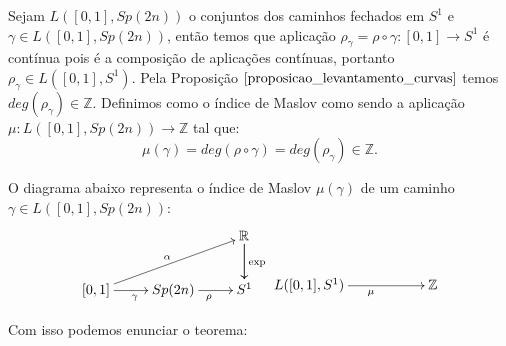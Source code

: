 \documentclass[12pt]{book}
\newcommand{\caminhosfechadoscirculo}[2]{L([#1,#2], S^{1})}
\newcommand{\caminhosfechadosSp}[2]{L([#1,#2], \gruposimpletico{2n})}
\newcommand{\gruposimpletico}[1]{Sp(#1)}
\newcommand{\real}[1]{\mathbb{R}^{#1}}
\begin{document}
	Sejam $\caminhosfechadosSp{0}{1}$ o conjuntos dos caminhos fechados em $S^{1}$ e $\gamma \in \caminhosfechadosSp{0}{1}$, então temos que aplicação $\rho_{\gamma}=\rho\circ \gamma:[0,1] \to S^{1}$ é contínua pois é a composição de aplicações contínuas, portanto $\rho_{\gamma} \in \caminhosfechadoscirculo{0}{1}$. Pela Proposição $\ref{proposicao_levantamento_curvas}$ temos $deg(\rho_{\gamma}) \in \mathbb{Z}$. Definimos como o índice de Maslov como sendo a aplicação $\mu:\caminhosfechadosSp{0}{1} \to \mathbb{Z}$ tal que:
	$$
	\mu(\gamma) = deg(\rho \circ \gamma) = deg(\rho_{\gamma}) \in \mathbb{Z}.
	$$

	O diagrama abaixo representa o índice de Maslov $\mu(\gamma)$ de um caminho $\gamma \in \caminhosfechadosSp{0}{1}$:
	$$
	\xymatrix{
		& & \real{}\ar[d]\ar[d]^{\text{exp}}
		\\
		[0,1 ]\ar[urr]^{\alpha} \ar[r]_{\gamma} & Sp(2n) \ar[r]_{\rho} & S^{1}
	}
	\xymatrix{
		& &
		\\
		\caminhosfechadoscirculo{0}{1}\ar[rr]_{\mu} & & \mathbb{Z} 
	}
	$$

	Com isso podemos enunciar o teorema:
		
\end{document}
